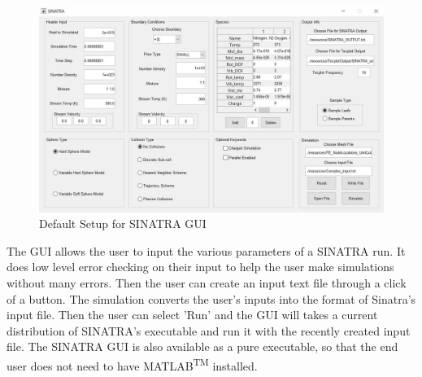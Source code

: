 \begin{figure}
\includegraphics[width=.95\textwidth]{figures/SINATRA_GUI.JPG}
\centering
\caption{Default Setup for SINATRA GUI}
\label{fig:SinatraGUI}
\end{figure}


\indent The GUI allows the user to input the various parameters of a SINATRA run. It does low level error checking on their input to help the user make simulations without many errors. Then the user can create an input text file through a click of a button. The simulation converts the user's inputs into the format of Sinatra's input file. Then the user can select 'Run' and the GUI will takes a current distribution of SINATRA's executable and run it with the recently created input file. The SINATRA GUI is also available as a pure executable, so that the end user does not need to have MATLAB\textsuperscript{TM} installed. 

